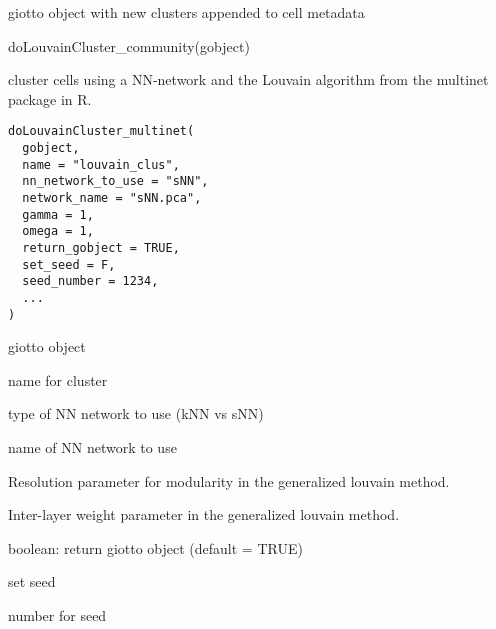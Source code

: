 \documentclass[a4paper]{book}
\begin{document}
%
\begin{Value}
giotto object with new clusters appended to cell metadata
\end{Value}
%
\begin{Examples}
\begin{ExampleCode}
    doLouvainCluster_community(gobject)
\end{ExampleCode}
\end{Examples}
%
\begin{Description}\relax
cluster cells using a NN-network and the Louvain algorithm from the multinet package in R.
\end{Description}
%
\begin{Usage}
\begin{verbatim}
doLouvainCluster_multinet(
  gobject,
  name = "louvain_clus",
  nn_network_to_use = "sNN",
  network_name = "sNN.pca",
  gamma = 1,
  omega = 1,
  return_gobject = TRUE,
  set_seed = F,
  seed_number = 1234,
  ...
)
\end{verbatim}
\end{Usage}
%
\begin{Arguments}
\begin{ldescription}
\item[\code{gobject}] giotto object

\item[\code{name}] name for cluster

\item[\code{nn\_network\_to\_use}] type of NN network to use (kNN vs sNN)

\item[\code{network\_name}] name of NN network to use

\item[\code{gamma}] Resolution parameter for modularity in the generalized louvain method.

\item[\code{omega}] Inter-layer weight parameter in the generalized louvain method.

\item[\code{return\_gobject}] boolean: return giotto object (default = TRUE)

\item[\code{set\_seed}] set seed

\item[\code{seed\_number}] number for seed
\end{ldescription}
\end{Arguments}
\end{document}
